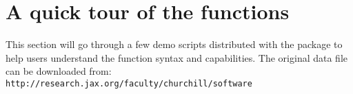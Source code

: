 \newpage
\section{A quick tour of the functions}
This section will go through a few demo scripts 
distributed with the package to help users 
understand the function syntax and capabilities. 
The original data file can be 
downloaded from: \\
{\tt http://research.jax.org/faculty/churchill/software}

